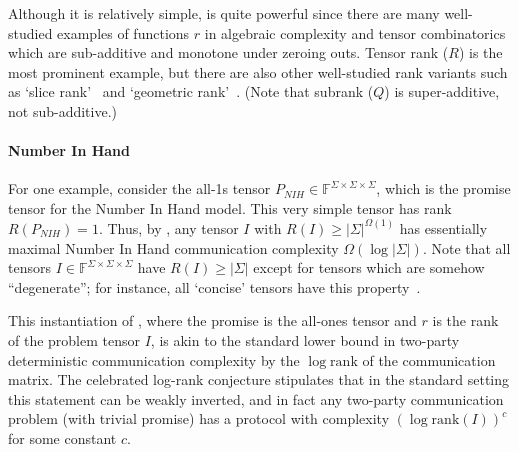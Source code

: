 \documentclass[10pt,a4paper]{article}
\newcommand{\F}{\mathbb{F}}
\newcommand{\jnote}[1]{\todo[inline, color=blue!30!white]{#1 \\ -\textsc{Jarek}}}
\newcommand{\joshnote}[1]{\todo[inline, color=red!30!white]{#1 \\ -\textsc{Josh}}}
\begin{document}

Although it is relatively simple,  is quite powerful since there are many well-studied examples of functions $r$ in algebraic complexity and tensor combinatorics which are sub-additive and monotone under zeroing outs. Tensor rank ($R$) is the most prominent example, but there are also other well-studied rank variants such as `slice rank'~\cite{T16} and `geometric rank'~\cite{KMZ20}. (Note that subrank ($Q$) is super-additive, not sub-additive.)

\paragraph{Number In Hand}
For one example, consider the all-1s tensor $P_{NIH} \in \F^{\Sigma \times \Sigma \times \Sigma}$, which is the promise tensor for the Number In Hand model. This very simple tensor has rank $R(P_{NIH}) = 1$. Thus, by , any tensor $I$ with $R(I) \geq |\Sigma|^{\Omega(1)}$ has essentially maximal Number In Hand communication complexity $\Omega(\log |\Sigma|)$. Note that all tensors $I \in \F^{\Sigma \times \Sigma \times \Sigma}$ have $R(I) \geq |\Sigma|$ except for tensors which are somehow ``degenerate''; for instance, all `concise' tensors have this property~\cite{CHLVW18}.

This instantiation of , where the promise is the all-ones tensor and $r$ is the rank of the problem tensor $I$, is akin to the standard lower bound in two-party deterministic communication complexity by the $\log \mathrm{rank}$ of the communication matrix. The celebrated log-rank conjecture stipulates that in the standard setting this statement can be weakly inverted, and in fact any two-party communication problem (with trivial promise) has a protocol with complexity $(\log \mathrm{rank}(I))^c$ for some constant $c$.
\end{document}
